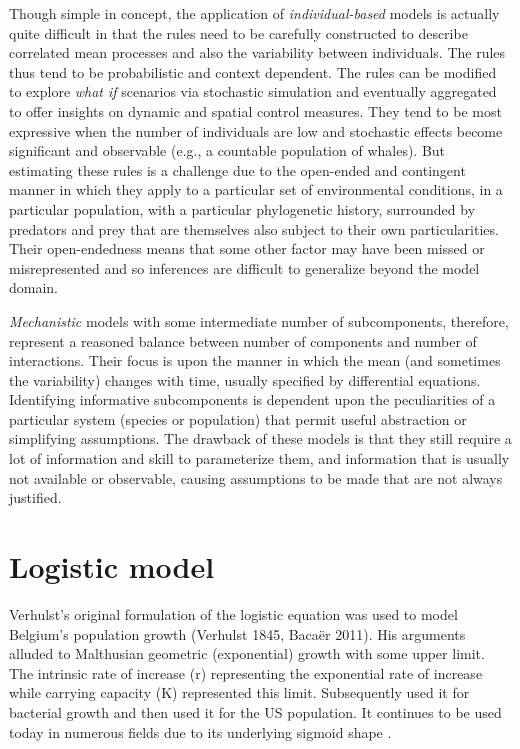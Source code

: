 \documentclass[
	letterpaper, %
	10pt, %
]{article}
\begin{document}
\begin{appendices}
Though simple in concept, the application of \emph{individual-based}
models is actually quite difficult in that the rules need to be carefully
constructed to describe correlated mean processes and also the variability
between individuals. The rules thus tend to be probabilistic and context
dependent. The rules can be modified to explore \emph{what if} scenarios
via stochastic simulation and eventually aggregated to offer insights
on dynamic and spatial control measures. They tend to be most expressive
when the number of individuals are low and stochastic effects become
significant and observable (e.g., a countable population of whales).
But estimating these rules is a challenge due to the open-ended and
contingent manner in which they apply to a particular set of environmental
conditions, in a particular population, with a particular phylogenetic
history, surrounded by predators and prey that are themselves also
subject to their own particularities. Their open-endedness means that
some other factor may have been missed or misrepresented and so inferences
are difficult to generalize beyond the model domain.

\emph{Mechanistic} models with some intermediate number of subcomponents,
therefore, represent a reasoned balance between number of components
and number of interactions. Their focus is upon the manner in which
the mean (and sometimes the variability) changes with time, usually
specified by differential equations. Identifying informative subcomponents
is dependent upon the peculiarities of a particular system (species
or population) that permit useful abstraction or simplifying assumptions.
The drawback of these models is that they still require a lot of information
and skill to parameterize them, and information that is usually not available
or observable, causing assumptions to be made that are not always
justified.


\section{Logistic model}
\label{logistic}

Verhulst's original formulation of the logistic equation was used
to model Belgium's population growth {(Verhulst 1845, Bacaër 2011)}.
His arguments alluded to Malthusian geometric (exponential) growth
with some upper limit. The intrinsic rate of increase (r) representing
the exponential rate of increase while carrying capacity (K) represented
this limit. Subsequently \cite{McKendrick_Pai_1912} used
it for bacterial growth and then \cite{Pearl_Reed_1920, Lotka_1925} used
it for the US population. It continues to be used today in numerous
fields due to its underlying sigmoid shape \cite{Beverton_Holt_1957, Pianka_1970, Bohner_Chieochan_2013}. 


\end{appendices}
\end{document}
